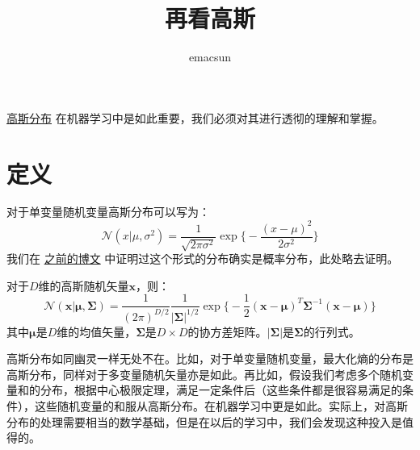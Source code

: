 \documentclass[10pt,a4paper,UTF8]{article}
\author{emacsun}
\date{}
\title{再看高斯}
\begin{document}
\maketitle
\tableofcontents
{}
\href{file:///c:/Users/cliyh/AppData/Roaming/zorg/output/math/probability/gauss-distribution.org}{高斯分布} 在机器学习中是如此重要，我们必须对其进行透彻的理解和掌握。

\section{定义}
\label{sec:org9d9b6a5}


对于单变量随机变量高斯分布可以写为：
\begin{equation}
\label{eq:1}
\mathcal{N}(x|\mu,\sigma^{2}) = \frac{1}{\sqrt{2\pi \sigma^{2}}} \exp\bigg\{-\frac{(x-\mu)^{2}}{2\sigma^{2}} \bigg\}
\end{equation}
我们在 \href{file:///c:/Users/cliyh/AppData/Roaming/zorg/output/math/probability/gauss-distribution.org}{之前的博文} 中证明过这个形式的分布确实是概率分布，此处略去证明。

对于\(D\)维的高斯随机矢量\(\mathbf{x}\)，则：
\begin{equation}
\label{eq:2}
\mathcal{N}(\mathbf{x}| \mathbf{\mu}, \mathbf{\Sigma}) = \frac{1}{(2\pi)^{D/2}}\frac{1}{| \mathbf{\Sigma} |^{1/2}}\exp \bigg\{ -\frac{1}{2}( \mathbf{x} - \mathbf{\mu} )^{T} \mathbf{\Sigma}^{-1} ( \mathbf{x} - \mathbf{\mu} ) \bigg\}
\end{equation}
其中\(\mathbf{\mu}\)是\(D\)维的均值矢量，\(\mathbf{\Sigma}\)是\(D\times D\)的协方差矩阵。\(| \mathbf{\Sigma} |\)是\(\mathbf{\Sigma}\)的行列式。

高斯分布如同幽灵一样无处不在。比如，对于单变量随机变量，最大化熵的分布是高斯分布，同样对于多变量随机矢量亦是如此。再比如，假设我们考虑多个随机变量和的分布，根据中心极限定理，满足一定条件后（这些条件都是很容易满足的条件），这些随机变量的和服从高斯分布。在机器学习中更是如此。实际上，对高斯分布的处理需要相当的数学基础，但是在以后的学习中，我们会发现这种投入是值得的。
\end{document}
